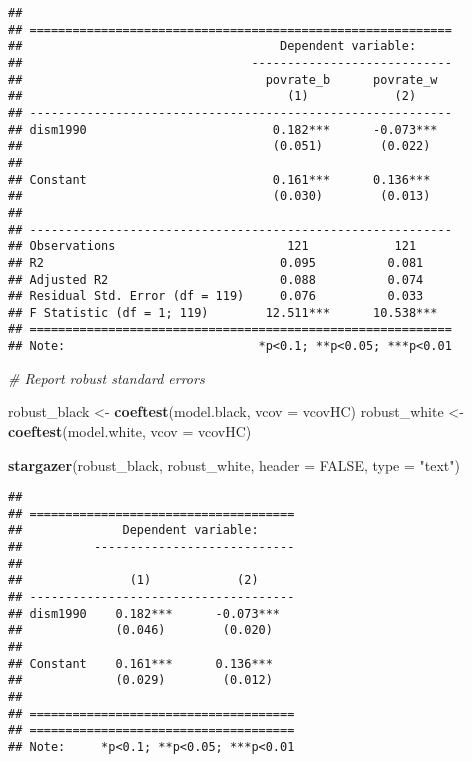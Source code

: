 \documentclass[
]{article}
\newenvironment{Shaded}{\begin{snugshade}}{\end{snugshade}}
\newcommand{\AttributeTok}[1]{\textcolor[rgb]{0.13,0.29,0.53}{#1}}
\newcommand{\CommentTok}[1]{\textcolor[rgb]{0.56,0.35,0.01}{\textit{#1}}}
\newcommand{\ConstantTok}[1]{\textcolor[rgb]{0.56,0.35,0.01}{#1}}
\newcommand{\FunctionTok}[1]{\textcolor[rgb]{0.13,0.29,0.53}{\textbf{#1}}}
\newcommand{\NormalTok}[1]{#1}
\newcommand{\OtherTok}[1]{\textcolor[rgb]{0.56,0.35,0.01}{#1}}
\newcommand{\StringTok}[1]{\textcolor[rgb]{0.31,0.60,0.02}{#1}}
\begin{document}
\begin{verbatim}
## 
## ===========================================================
##                                    Dependent variable:     
##                                ----------------------------
##                                  povrate_b      povrate_w  
##                                     (1)            (2)     
## -----------------------------------------------------------
## dism1990                          0.182***      -0.073***  
##                                   (0.051)        (0.022)   
##                                                            
## Constant                          0.161***      0.136***   
##                                   (0.030)        (0.013)   
##                                                            
## -----------------------------------------------------------
## Observations                        121            121     
## R2                                 0.095          0.081    
## Adjusted R2                        0.088          0.074    
## Residual Std. Error (df = 119)     0.076          0.033    
## F Statistic (df = 1; 119)        12.511***      10.538***  
## ===========================================================
## Note:                           *p<0.1; **p<0.05; ***p<0.01
\end{verbatim}

\begin{Shaded}
\begin{Highlighting}[]
\CommentTok{\# Report robust standard errors}

\NormalTok{robust\_black }\OtherTok{\textless{}{-}} \FunctionTok{coeftest}\NormalTok{(model.black, }\AttributeTok{vcov =}\NormalTok{ vcovHC)}
\NormalTok{robust\_white }\OtherTok{\textless{}{-}} \FunctionTok{coeftest}\NormalTok{(model.white, }\AttributeTok{vcov =}\NormalTok{ vcovHC)}

\FunctionTok{stargazer}\NormalTok{(robust\_black, robust\_white, }\AttributeTok{header =} \ConstantTok{FALSE}\NormalTok{, }\AttributeTok{type =} \StringTok{"text"}\NormalTok{)}
\end{Highlighting}
\end{Shaded}

\begin{verbatim}
## 
## =====================================
##              Dependent variable:     
##          ----------------------------
##                                      
##               (1)            (2)     
## -------------------------------------
## dism1990    0.182***      -0.073***  
##             (0.046)        (0.020)   
##                                      
## Constant    0.161***      0.136***   
##             (0.029)        (0.012)   
##                                      
## =====================================
## =====================================
## Note:     *p<0.1; **p<0.05; ***p<0.01
\end{verbatim}
\end{document}
